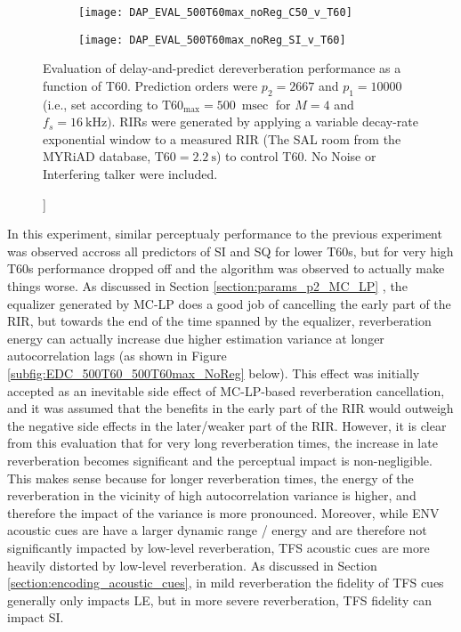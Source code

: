 \begin{figure}[H]
	\centering
	\begin{subfigure}[b]{0.47\textwidth}
		\centering
		\texttt{[image: DAP\_EVAL\_500T60max\_noReg\_C50\_v\_T60]}
	\end{subfigure}
	\begin{subfigure}[b]{0.92\textwidth}
		\centering
		\texttt{[image: DAP\_EVAL\_500T60max\_noReg\_SI\_v\_T60]}
	\end{subfigure}
	\caption[DAP Evaluation with $p_2=2667$]]{Evaluation of delay-and-predict dereverberation performance as a function of T60. Prediction orders were $p_2 = 2667$ and $p_1=10000$ (i.e., set according to $\mathrm{T60}_{\mathrm{max}} = \qty{500}{\milli\sec}$ for $M=4$ and $f_s=\qty{16}{\kilo\hertz})$. RIRs were generated by applying a variable decay-rate exponential window to a measured RIR (The SAL room from the MYRiAD database, $\mathrm{T60} = \qty{2.2}{\second}$) to control T60. No Noise or Interfering talker were included.}
	\label{fig:DAP_EVAL_500T60max_noReg}
\end{figure}

In this experiment, similar perceptualy performance to the previous experiment was observed accross all predictors of SI and SQ for lower T60s, but for very high T60s performance dropped off and the algorithm was observed to actually make things worse. As discussed in Section \ref{section:params_p2_MC_LP} , the equalizer generated by MC-LP does a good job of cancelling the early part of the RIR, but towards the end of the time spanned by the equalizer, reverberation energy can actually increase due higher estimation variance at longer autocorrelation lags (as shown in Figure \ref{subfig:EDC_500T60_500T60max_NoReg} below). This effect was initially accepted as an inevitable side effect of MC-LP-based reverberation cancellation, and it was assumed that the benefits in the early part of the RIR would outweigh the negative side effects in the later/weaker part of the RIR.  However, it is clear from this evaluation that for very long reverberation times, the increase in late reverberation becomes significant and the perceptual impact is non-negligible. This makes sense because for longer reverberation times, the energy of the reverberation in the vicinity of high autocorrelation variance is higher, and therefore the impact of the variance is more pronounced. Moreover, while ENV acoustic cues are have a larger dynamic range / energy and are therefore not significantly impacted by low-level reverberation, TFS acoustic cues are more heavily distorted by low-level reverberation. As discussed in Section \ref{section:encoding_acoustic_cues}, in mild reverberation the fidelity of TFS cues generally only impacts LE, but in more severe reverberation, TFS fidelity can impact SI.


